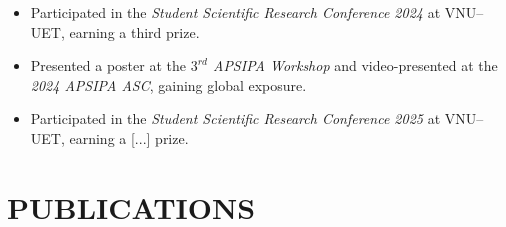 \documentclass[a4paper,9pt]{extarticle}
\begin{document}
\begin{itemize}
    \item Participated in the \textit{Student Scientific Research Conference 2024} at VNU--UET, earning a third prize.
    \item Presented a poster at the \textit{\(3^{rd}\) APSIPA Workshop} and video-presented at the \textit{2024 APSIPA ASC}, gaining global exposure.
    \item Participated in the \textit{Student Scientific Research Conference 2025} at VNU--UET, earning a [...] prize.
\end{itemize}



\section*{PUBLICATIONS}
\end{document}
